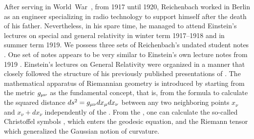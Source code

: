 \documentclass[final]{article}
\newcommand{\xdx}{\ensuremath{x_\nu} and \ensuremath{x_\nu + dx_\nu}\xspace}
\begin{document}
After serving in World~War~, from 1917 until 1920, Reichenbach worked in Berlin as an engineer specializing in radio technology to support himself after the death of his father. Nevertheless, in his spare time, he managed to attend Einstein's lectures on special and general relativity in winter term 1917--1918 and in summer term 1919. We possess three sets of Reichenbach's undated student notes \citep[028-01-04, 028-01-03, 028-01-01]{HR}. One set of notes \citep[028-01-01]{HR} appears to be very similar to Einstein's own lecture notes from 1919 \citep{Einstein1919c}. Einstein's lectures on General Relativity were organized in a manner that closely followed the structure of his previously published presentations of \rt {}. The mathematical apparatus of Riemannian geometry is introduced by starting from the metric $g_{\mu\nu}$ as the fundamental concept, that is, from the formula to calculate the squared distance $ds^2=g_{\mu\nu} dx_\mu dx_\nu$ between any two neighboring points \xdx independently of the \cs. From the \gmn, one can calculate the so-called Christoffel symbols \christoffel{\mu}{\nu}{\tau}, which enters the geodesic equation, and the Riemann tensor \rite which generalized the Gaussian notion of curvature. 
\end{document}
